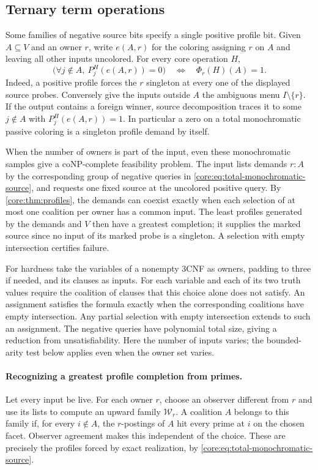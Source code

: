 \subsection{Ternary term operations}
Some families of negative source bits specify a single positive profile
bit. Given $A\subseteq V$ and an owner $r$, write $e(A,r)$ for the
coloring assigning $r$ on $A$ and leaving all other inputs uncolored.
For every core operation $H$,
\begin{equation}\label{core:eq:total-monochromatic-source}
 \bigl(\forall j\notin A,\ P_j^H(e(A,r))=0\bigr)
 \quad\Longleftrightarrow\quad \Phi_r(H)(A)=1 .
\end{equation}
Indeed, a positive profile forces the $r$ singleton at every one of
the displayed source probes. Conversely give the inputs outside $A$
the ambiguous menu $I\setminus\{r\}$. If the output contains a foreign
winner, source decomposition traces it to some $j\notin A$ with
$P_j^H(e(A,r))=1$. In particular a zero on a total monochromatic
passive coloring is a singleton profile demand by itself.

When the number of owners is part of the input, even these monochromatic
samples give a coNP-complete feasibility problem. The input lists demands
$r:A$ by the corresponding group of negative queries in
\eqref{core:eq:total-monochromatic-source}, and requests one fixed
source at the uncolored positive query. By \cref{core:thm:profiles},
the demands can coexist exactly when each selection of at most one
coalition per owner has a common input. The least profiles generated
by the demands and $V$ then have a greatest completion; it supplies
the marked source since no input of its marked probe is a singleton.
A selection with empty intersection certifies failure.

For hardness take the variables of a nonempty 3CNF as owners, padding
to three if needed, and its clauses as inputs. For each variable and
each of its two truth values require the coalition of clauses that this
choice alone does not satisfy. An assignment satisfies the formula
exactly when the corresponding coalitions have empty intersection.
Any partial selection with empty intersection extends to such an
assignment. The negative queries have polynomial total size, giving a
reduction from unsatisfiability. Here the number of inputs varies;
the bounded-arity test below applies even when the owner set varies.

\paragraph{Recognizing a greatest profile completion from primes.}
Let every input be live. For each owner $r$, choose an observer
different from $r$ and use its lists to compute an upward family
$\mathcal W_r$. A coalition $A$ belongs to this family if, for
every $i\notin A$, the $r$-postings of $A$ hit every prime at
$i$ on the chosen facet. Observer agreement makes this independent
of the choice. These are precisely the profiles forced by exact
realization, by \eqref{core:eq:total-monochromatic-source}.

